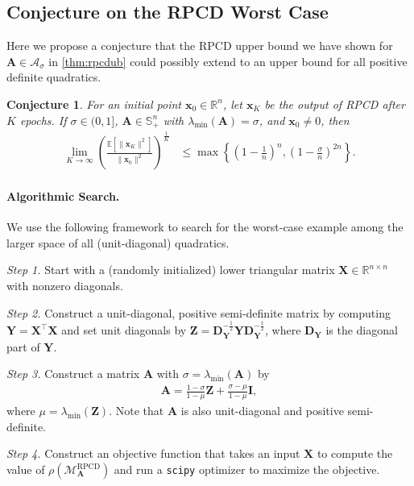 \documentclass{article}
\theoremstyle{plain}
\newtheorem{conjecture}[theorem]{Conjecture} %
\theoremstyle{definition}
\theoremstyle{remark}
\def\bigopen#1{\left(#1\right)}
\def\bigset#1{\left\{#1\right\}}
\def\bigclosed#1{\left[#1\right]}
\newcommand{\RPCD}{\text{RPCD}} %
\newcommand{\MARPCD}{\mathcal{M}_{\bm{A}}^{\RPCD}} %
\def\vx{{\bm{x}}}
\def\mA{{\bm{A}}}
\def\mD{{\bm{D}}}
\def\mI{{\bm{I}}}
\def\mX{{\bm{X}}}
\def\mY{{\bm{Y}}}
\def\mZ{{\bm{Z}}}
\def\gA{{\mathcal{A}}}
\def\sS{{\mathbb{S}}}
\newcommand{\E}{\mathbb{E}}
\newcommand{\R}{\mathbb{R}}
\begin{document}
\subsection{Conjecture on the RPCD Worst Case}

Here we propose a conjecture that the RPCD upper bound we have shown for $\mA \in \gA_{\sigma}$ in \cref{thm:rpcdub} could possibly extend to an upper bound for all positive definite quadratics.
\begin{conjecture}
    \label{conj:general}
    For an initial point $\vx_0\in \R^{n}$, let $\vx_K$ be the output of \emph{RPCD} after $K$ epochs.
    If $\sigma \in (0, 1]$, $\mA \in \sS_{+}^{n}$ with $\lambda_{\min} (\mA) = \sigma$, and $\vx_0 \ne 0$, then
    \begin{align*}
        \lim_{K \to \infty} \bigopen{\frac{\E\bigclosed{\|\vx_K\|^2}}{\|\vx_0\|^2}}^{\!\!\frac{1}{K}} \!\!\!\! &\le \max \bigset{\bigopen{1 - \frac{1}{n}}^n\!\!\!, \bigopen{1 - \frac{\sigma}{n}}^{2n}}.
    \end{align*}
\end{conjecture}

\paragraph{Algorithmic Search.} 
We use the following framework to search for the worst-case example among the larger space of all (unit-diagonal) quadratics.

\begin{mdframed}[backgroundcolor=black!10]
    \emph{Step 1.} Start with a (randomly initialized) lower triangular matrix $\mX \in \R^{n \times n}$ with nonzero diagonals.

    \emph{Step 2.} Construct a unit-diagonal, positive semi-definite matrix by computing $\mY = \mX^{\top} \mX$ and set unit diagonals by $\mZ = \mD_{\mY}^{-\frac12} \mY \mD_{\mY}^{-\frac12}$, where $\mD_{\mY}$ is the diagonal part of $\mY$.
    
    \emph{Step 3.} Construct a matrix $\mA$ with $\sigma = \lambda_{\min} (\mA)$ by
    \begin{align*}
        \mA = \frac{1 - \sigma}{1 - \mu} \mZ + \frac{\sigma - \mu}{1 - \mu} \mI,
    \end{align*}
    where $\mu = \lambda_{\min} (\mZ)$.
    Note that $\mA$ is also unit-diagonal and positive semi-definite.
    
    \emph{Step 4.} Construct an objective function that takes an input $\mX$ to compute the value of $\rho(\MARPCD)$ and run a \texttt{scipy} optimizer to maximize the objective.
\end{mdframed}
\end{document}
